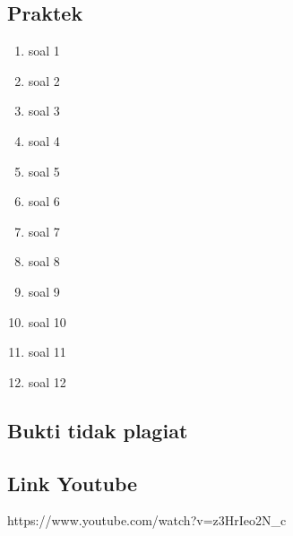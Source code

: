 \subsection{Praktek}
	\begin{enumerate}
		\item soal 1
			
		\item soal 2
			
		\item soal 3
			
		\item soal 4
			

		\item soal 5
			
		\item soal 6
			
		\item soal 7
			
		\item soal 8
			
		\item soal 9
			
		\item soal 10
			
		\item soal 11
			
		\item soal 12
			
		

		
	\end{enumerate}
	
\subsection{Bukti tidak plagiat}

\subsection{Link Youtube}
https://www.youtube.com/watch?v=z3HrIeo2N\_c
	